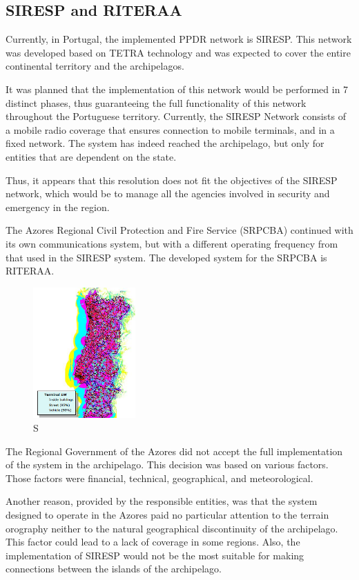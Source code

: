 \documentclass[letterpaper, 10 pt, conference]{ieeeconf}  %
\begin{document}
\subsection{SIRESP and RITERAA} 
Currently, in Portugal, the implemented PPDR network is SIRESP.  
This network was developed based on TETRA technology and was expected to cover the entire continental territory and the archipelagos.\par\noindent
It was planned that the implementation of this network would be performed in 7 distinct phases, thus guaranteeing the full functionality of this network throughout the Portuguese territory.
Currently, the SIRESP Network consists of a mobile radio coverage that ensures connection to mobile terminals, and in a fixed network.
The system has indeed reached the archipelago, but only for entities that are dependent on the state.\par\noindent
Thus, it appears that this resolution does not fit the objectives of the SIRESP network, which would be to manage all the agencies involved in security and emergency in the region.\par\noindent
The Azores Regional Civil Protection and Fire Service (SRPCBA) continued with its own communications system, but with a different operating frequency from that used in the SIRESP system. The developed system for the SRPCBA is RITERAA.
\begin{figure}
    \centering
    \includegraphics[width=0.35\textwidth]{SirespCobertura.png}
    \caption{S}
    \label{fig:SIRESP}
\end{figure}
\FloatBarrier
\noindent
The  Regional Government of the Azores did not accept the full implementation of the system in the archipelago. This decision was based on various factors. Those factors were financial, technical, geographical, and meteorological.\par\noindent
Another reason, provided by the responsible entities, was that the system designed to operate in the Azores paid no particular attention to the terrain orography neither to the natural geographical discontinuity of the archipelago. This factor could lead to a lack of coverage in some regions. Also, the implementation of  SIRESP would not be the most suitable for making connections between the islands of the archipelago.\par\noindent
\end{document}
